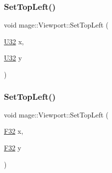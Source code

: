 \hypertarget{structmage_1_1_viewport_a14f63922d0bd2613b3fc2b86683f13a7}{}\label{structmage_1_1_viewport_a14f63922d0bd2613b3fc2b86683f13a7} 
\subsubsection{\texorpdfstring{Set\+Top\+Left()}{SetTopLeft()}\hspace{0.1cm}{\footnotesize\ttfamily [1/2]}}
{\footnotesize\ttfamily void mage\+::\+Viewport\+::\+Set\+Top\+Left (\begin{DoxyParamCaption}\item[{\hyperlink{namespacemage_a41c104c036fba3756a74e19f793eeaa1}{U32}}]{x,  }\item[{\hyperlink{namespacemage_a41c104c036fba3756a74e19f793eeaa1}{U32}}]{y }\end{DoxyParamCaption})\hspace{0.3cm}{\ttfamily [noexcept]}}

\hypertarget{structmage_1_1_viewport_a982a30c583445f04516cfae876667e62}{}\label{structmage_1_1_viewport_a982a30c583445f04516cfae876667e62} 
\subsubsection{\texorpdfstring{Set\+Top\+Left()}{SetTopLeft()}\hspace{0.1cm}{\footnotesize\ttfamily [2/2]}}
{\footnotesize\ttfamily void mage\+::\+Viewport\+::\+Set\+Top\+Left (\begin{DoxyParamCaption}\item[{\hyperlink{namespacemage_aa97e833b45f06d60a0a9c4fc22ae02c0}{F32}}]{x,  }\item[{\hyperlink{namespacemage_aa97e833b45f06d60a0a9c4fc22ae02c0}{F32}}]{y }\end{DoxyParamCaption})\hspace{0.3cm}{\ttfamily [noexcept]}}

\hypertarget{structmage_1_1_viewport_a12a0d7b74ce81786e38f08d399acafc6}{}\label{structmage_1_1_viewport_a12a0d7b74ce81786e38f08d399acafc6} 

